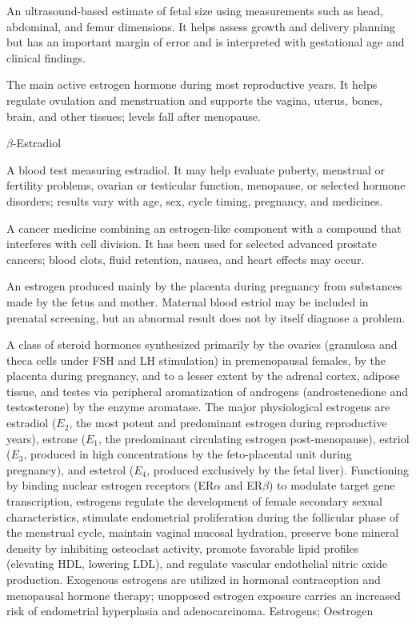  An ultrasound-based estimate of fetal size using measurements such as head, abdominal, and femur dimensions. It helps assess growth and delivery planning but has an important margin of error and is interpreted with gestational age and clinical findings.

 The main active estrogen hormone during most reproductive years. It helps regulate ovulation and menstruation and supports the vagina, uterus, bones, brain, and other tissues; levels fall after menopause.

$\beta$-Estradiol

 A blood test measuring estradiol. It may help evaluate puberty, menstrual or fertility problems, ovarian or testicular function, menopause, or selected hormone disorders; results vary with age, sex, cycle timing, pregnancy, and medicines.

 A cancer medicine combining an estrogen-like component with a compound that interferes with cell division. It has been used for selected advanced prostate cancers; blood clots, fluid retention, nausea, and heart effects may occur.

 An estrogen produced mainly by the placenta during pregnancy from substances made by the fetus and mother. Maternal blood estriol may be included in prenatal screening, but an abnormal result does not by itself diagnose a problem.

 A class of steroid hormones synthesized primarily by the ovaries (granulosa and theca cells under FSH and LH stimulation) in premenopausal females, by the placenta during pregnancy, and to a lesser extent by the adrenal cortex, adipose tissue, and testes via peripheral aromatization of androgens (androstenedione and testosterone) by the enzyme aromatase. The major physiological estrogens are estradiol ($E_2$, the most potent and predominant estrogen during reproductive years), estrone ($E_1$, the predominant circulating estrogen post-menopause), estriol ($E_3$, produced in high concentrations by the feto-placental unit during pregnancy), and estetrol ($E_4$, produced exclusively by the fetal liver). Functioning by binding nuclear estrogen receptors (ER$\alpha$ and ER$\beta$) to modulate target gene transcription, estrogens regulate the development of female secondary sexual characteristics, stimulate endometrial proliferation during the follicular phase of the menstrual cycle, maintain vaginal mucosal hydration, preserve bone mineral density by inhibiting osteoclast activity, promote favorable lipid profiles (elevating HDL, lowering LDL), and regulate vascular endothelial nitric oxide production. Exogenous estrogens are utilized in hormonal contraception and menopausal hormone therapy; unopposed estrogen exposure carries an increased risk of endometrial hyperplasia and adenocarcinoma.
\synonyms
Estrogens; Oestrogen

